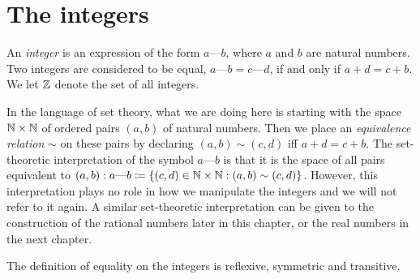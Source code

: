 \section{The integers}\label{sec:4.1}

\begin{defn}[Integers]\label{4.1.1}
  An \emph{integer} is an expression of the form \(a \text{---} b\), where \(a\) and \(b\) are natural numbers.
  Two integers are considered to be equal, \(a \text{---} b = c \text{---} d\), if and only if \(a + d = c + b\).
  We let \(\mathbb{Z}\) denote the set of all integers.
\end{defn}

\begin{note}
  In the language of set theory, what we are doing here is starting with the space \(\mathbb{N} \times \mathbb{N}\) of ordered pairs \((a, b)\) of natural numbers.
  Then we place an \emph{equivalence relation} \(\sim\) on these pairs by declaring \((a, b) \sim (c, d)\) iff \(a + d = c + b\).
  The set-theoretic interpretation of the symbol \(a \text{---} b\) is that it is the space of all pairs equivalent to \((a, b): a \text{---} b \coloneqq \{(c, d) \in \mathbb{N} \times \mathbb{N} : (a, b) \sim (c, d)\}\).
  However, this interpretation plays no role in how we manipulate the integers and we will not refer to it again.
  A similar set-theoretic interpretation can be given to the construction of the rational numbers later in this chapter, or the real numbers in the next chapter.
\end{note}

\begin{ac}\label{ac:4.1.1}
  The definition of equality on the integers is reflexive, symmetric and transitive.
\end{ac}

